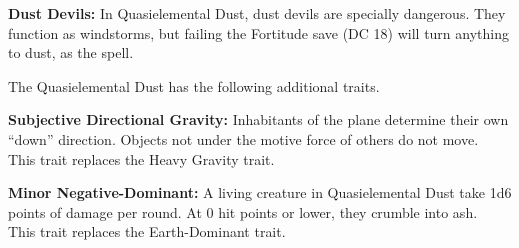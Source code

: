 \textbf{Dust Devils:} In Quasielemental Dust, dust devils are specially dangerous. They function as windstorms, but failing the Fortitude save (DC 18) will turn anything to dust, as the  spell.

The Quasielemental Dust has the following additional traits.
\begin{itemize*}
\item \textbf{Subjective Directional Gravity:} Inhabitants of the plane determine their own ``down'' direction. Objects not under the motive force of others do not move.\\

This trait replaces the Heavy Gravity trait.
\item \textbf{Minor Negative-Dominant:} A living creature in Quasielemental Dust take 1d6 points of damage per round. At 0 hit points or lower, they crumble into ash.\\

This trait replaces the Earth-Dominant trait.
\end{itemize*}
